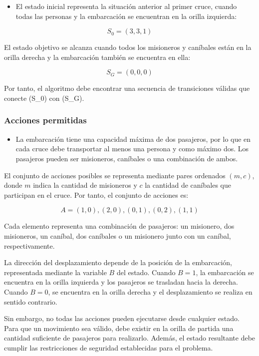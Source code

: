 \documentclass[
  spanish,
]{llncs}
\providecommand{\tightlist}{%
  \setlength{\itemsep}{0pt}\setlength{\parskip}{0pt}}
\begin{document}
\begin{itemize}
\tightlist
\item
  El estado inicial representa la situación anterior al primer cruce,
  cuando todas las personas y la embarcación se encuentran en la orilla
  izquierda:
\end{itemize}

\[
S_0=(3,3,1)
\]

El estado objetivo se alcanza cuando todos los misioneros y caníbales
están en la orilla derecha y la embarcación también se encuentra en
ella:

\[
S_G=(0,0,0)
\]

Por tanto, el algoritmo debe encontrar una secuencia de transiciones
válidas que conecte (S\_0) con (S\_G).

\subsubsection{Acciones permitidas}\label{acciones-permitidas}

\begin{itemize}
\tightlist
\item
  La embarcación tiene una capacidad máxima de dos pasajeros, por lo que
  en cada cruce debe transportar al menos una persona y como máximo dos.
  Los pasajeros pueden ser misioneros, caníbales o una combinación de
  ambos.
\end{itemize}

El conjunto de acciones posibles se representa mediante pares ordenados
\((m,c)\), donde \(m\) indica la cantidad de misioneros y \(c\) la
cantidad de caníbales que participan en el cruce. Por tanto, el conjunto
de acciones es:

\[
A={(1,0),(2,0),(0,1),(0,2),(1,1)}
\]

Cada elemento representa una combinación de pasajeros: un misionero, dos
misioneros, un caníbal, dos caníbales o un misionero junto con un
caníbal, respectivamente.

La dirección del desplazamiento depende de la posición de la
embarcación, representada mediante la variable \(B\) del estado. Cuando
\(B=1\), la embarcación se encuentra en la orilla izquierda y los
pasajeros se trasladan hacia la derecha. Cuando \(B=0\), se encuentra en
la orilla derecha y el desplazamiento se realiza en sentido contrario.

Sin embargo, no todas las acciones pueden ejecutarse desde cualquier
estado. Para que un movimiento sea válido, debe existir en la orilla de
partida una cantidad suficiente de pasajeros para realizarlo. Además, el
estado resultante debe cumplir las restricciones de seguridad
establecidas para el problema.
\end{document}
